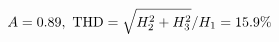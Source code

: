 \documentclass[preview]{standalone}
\begin{document}
\begin{align*}
\special{dvisvgm:raw <g id='unique000'>}A=0.89,\ \text{THD}=\sqrt{H_2^2+H_3^2}/H_1=15.9\%\special{dvisvgm:raw </g>}
\end{align*}
\end{document}
